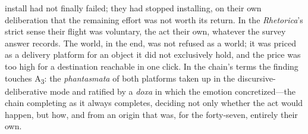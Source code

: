 install had not finally failed; they had stopped installing, on their own
deliberation that the remaining effort was not worth its return. In the
\textit{Rhetorica}'s strict sense their flight was voluntary, the act their
own, whatever the survey answer records. The world, in the end, was not refused as
a world; it was priced as a delivery platform for an object it did not
exclusively hold, and the price was too high for a destination reachable in
one click. In the chain's terms the finding touches A\textsubscript{3}: the
\textit{phantasmata} of both platforms taken up in the
discursive-deliberative mode and ratified by a \textit{doxa} in which the
emotion concretized---the chain completing as it always completes, deciding
not only whether the act would happen, but how, and from an origin that
was, for the forty-seven, entirely their own.
